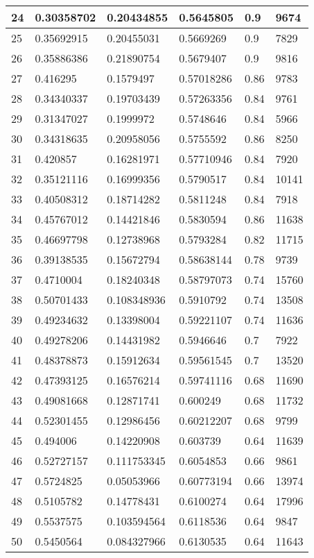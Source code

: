 \begin{longtable}{|l|l|l|l|l|l|}
24 & 0.30358702 & 0.20434855 & 0.5645805 & 0.9 & 9674 \\ \hline 
25 & 0.35692915 & 0.20455031 & 0.5669269 & 0.9 & 7829 \\ \hline 
26 & 0.35886386 & 0.21890754 & 0.5679407 & 0.9 & 9816 \\ \hline 
27 & 0.416295 & 0.1579497 & 0.57018286 & 0.86 & 9783 \\ \hline 
28 & 0.34340337 & 0.19703439 & 0.57263356 & 0.84 & 9761 \\ \hline 
29 & 0.31347027 & 0.1999972 & 0.5748646 & 0.84 & 5966 \\ \hline 
30 & 0.34318635 & 0.20958056 & 0.5755592 & 0.86 & 8250 \\ \hline 
31 & 0.420857 & 0.16281971 & 0.57710946 & 0.84 & 7920 \\ \hline 
32 & 0.35121116 & 0.16999356 & 0.5790517 & 0.84 & 10141 \\ \hline 
33 & 0.40508312 & 0.18714282 & 0.5811248 & 0.84 & 7918 \\ \hline 
34 & 0.45767012 & 0.14421846 & 0.5830594 & 0.86 & 11638 \\ \hline 
35 & 0.46697798 & 0.12738968 & 0.5793284 & 0.82 & 11715 \\ \hline 
36 & 0.39138535 & 0.15672794 & 0.58638144 & 0.78 & 9739 \\ \hline 
37 & 0.4710004 & 0.18240348 & 0.58797073 & 0.74 & 15760 \\ \hline 
38 & 0.50701433 & 0.108348936 & 0.5910792 & 0.74 & 13508 \\ \hline 
39 & 0.49234632 & 0.13398004 & 0.59221107 & 0.74 & 11636 \\ \hline 
40 & 0.49278206 & 0.14431982 & 0.5946646 & 0.7 & 7922 \\ \hline 
41 & 0.48378873 & 0.15912634 & 0.59561545 & 0.7 & 13520 \\ \hline 
42 & 0.47393125 & 0.16576214 & 0.59741116 & 0.68 & 11690 \\ \hline 
43 & 0.49081668 & 0.12871741 & 0.600249 & 0.68 & 11732 \\ \hline 
44 & 0.52301455 & 0.12986456 & 0.60212207 & 0.68 & 9799 \\ \hline 
45 & 0.494006 & 0.14220908 & 0.603739 & 0.64 & 11639 \\ \hline 
46 & 0.52727157 & 0.111753345 & 0.6054853 & 0.66 & 9861 \\ \hline 
47 & 0.5724825 & 0.05053966 & 0.60773194 & 0.66 & 13974 \\ \hline 
48 & 0.5105782 & 0.14778431 & 0.6100274 & 0.64 & 17996 \\ \hline 
49 & 0.5537575 & 0.103594564 & 0.6118536 & 0.64 & 9847 \\ \hline 
50 & 0.5450564 & 0.084327966 & 0.6130535 & 0.64 & 11643 \\ \hline 
\end{longtable}